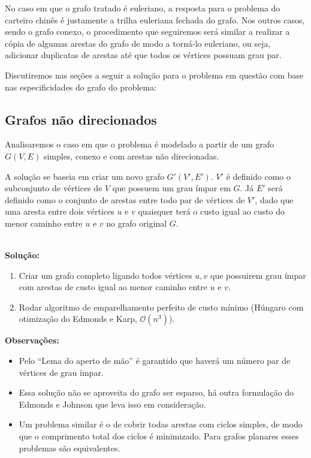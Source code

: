 \documentclass{article}
\begin{document}
No caso em que o grafo tratado é euleriano, a resposta para o problema do carteiro chinês é justamente a trilha euleriana fechada do grafo.
Nos outros casos, sendo o grafo conexo, o procedimento que seguiremos será similar a realizar a cópia de algumas arestas do grafo de modo a torná-lo euleriano, ou seja, adicionar duplicatas de arestas até que todos os vértices possuam grau par.

Discutiremos nas seções a seguir a solução para o problema em questão com base nas especificidades do grafo do problema:

\subsection{Grafos não direcionados}

Analisaremos o caso em que o problema é modelado a partir de um grafo $G(V, E)$ simples, conexo e com arestas não direcionadas.

A solução se baseia em criar um novo grafo $G'(V', E')$. 
$V'$ é definido como o subconjunto de vértices de $V$ que possuem um grau ímpar em $G$. 
Já $E'$ será definido como o conjunto de arestas entre todo par de vértices de $V'$, dado que uma aresta entre dois vértices $u$ e $v$ quaisquer terá o custo igual ao custo do menor caminho entre $u$ e $v$ no grafo original $G$.


\\

\textbf{Solução:} 
\begin{enumerate}
    \item Criar um grafo completo ligando todos vértices $u, v$ que possuirem grau ímpar com arestas de custo igual ao menor caminho entre $u$ e $v$. 
    \item Rodar algoritmo de emparelhamento perfeito de custo mínimo (Húngaro com otimização do Edmonds e Karp, $\mathcal{O}(n^3)$).
\end{enumerate}


\textbf{Observações:}
\begin{itemize}
		\item Pelo ``Lema do aperto de mão'' é garantido que haverá um número par de vértices de grau ímpar.
		\item Essa solução não se aproveita do grafo ser esparso, há outra formulação do Edmonds e Johnson que leva isso em consideração.
		\item Um problema similar é o de cobrir todas arestas com ciclos simples, de modo que o comprimento total dos ciclos é minimizado. Para grafos planares esses problemas são equivalentes.
	\end{itemize}
\end{document}

